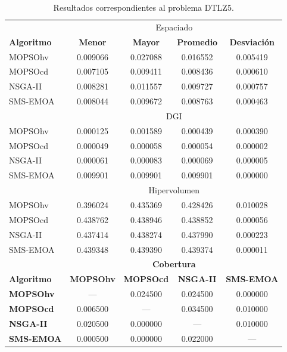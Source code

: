 \begin{table}
 \begin{center}
  \begin{tabular}{|l|cc|cc|} \hline
    & \multicolumn{4}{|c|}{Espaciado} \\ 
	\textbf{Algoritmo} & \textbf{Menor} & \textbf{Mayor} & \textbf{Promedio} & \textbf{Desviaci\'on} \\  \hline \hline
	MOPSOhv &0.009066 & 0.027088 & 0.016552 & 0.005419   \\ 
	MOPSOcd &0.007105 & 0.009411 & 0.008436 & 0.000610   \\ 
	NSGA-II &0.008281 & 0.011557 & 0.009727 & 0.000757  \\  
	SMS-EMOA &0.008044 & 0.009672 & 0.008763 & 0.000463  \\  
	\hline\hline
    & \multicolumn{4}{|c|}{DGI} \\ 
	\hline\hline
	MOPSOhv &0.000125 & 0.001589 & 0.000439 & 0.000390   \\ 
	MOPSOcd &0.000049 & 0.000058 & 0.000054 & 0.000002 \\ 
	NSGA-II &0.000061 & 0.000083 & 0.000069 & 0.000005   \\  
	SMS-EMOA &0.009901 & 0.009901 & 0.009901 & 0.000000   \\  
	\hline
    & \multicolumn{4}{|c|}{Hipervolumen} \\ 
	\hline\hline
	MOPSOhv &0.396024 & 0.435369 & 0.428426 & 0.010028   \\ 
	MOPSOcd &0.438762 & 0.438946 & 0.438852 & 0.000056  \\ 
	NSGA-II &0.437414 & 0.438274 & 0.437990 & 0.000223  \\  
	SMS-EMOA &0.439348 & 0.439390 & 0.439374 & 0.000011   \\  
	\hline\hline
	& \multicolumn{4}{|c|}{\textbf{Cobertura}} \\ \hline\hline 
	\textbf{Algoritmo} & \textbf{MOPSOhv} & \textbf{MOPSOcd} & \textbf{NSGA-II} & \textbf{SMS-EMOA} \\  \hline \hline
	\textbf{MOPSOhv} &---       & 0.024500   &   0.024500  &  0.000000   \\ 
	\textbf{MOPSOcd} & 0.006500 & ---        &  0.034500 &  0.010000 \\ 
	\textbf{NSGA-II} & 0.020500 &  0.000000  & ---       & 0.010000  \\  
	\textbf{SMS-EMOA}& 0.000500 &  0.000000  & 0.022000  & --- \\  
	\hline

	\end{tabular}
\caption{Resultados correspondientes al problema DTLZ5.}
  \label{tab:dtlz5}
\end{center}
\end{table}
